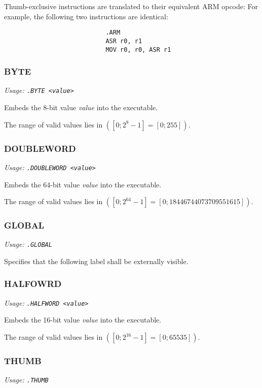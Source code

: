 \documentclass[a4paper]{article}
\begin{document}
				Thumb-exclusive instructions are translated to their equivalent ARM opcode: For example, the following two instructions are identical:

				\begin{center}
					\begin{varwidth}{\linewidth}
						\begin{verbatim}
							.ARM
							ASR r0, r1
							MOV r0, r0, ASR r1
						\end{verbatim}
					\end{varwidth}
				\end{center}

			\subsubsection{BYTE}
				\textit{Usage: \texttt{.BYTE <value>}}

				Embeds the 8-bit value \textit{value} into the executable.

				The range of valid values lies in $([0;2^8-1]=[0;255])$.

			\subsubsection{DOUBLEWORD}
				\textit{Usage: \texttt{.DOUBLEWORD <value>}}

				Embeds the 64-bit value \textit{value} into the executable.

				The range of valid values lies in $([0;2^{64}-1]=[0;18446744073709551615])$.

			\subsubsection{GLOBAL}
				\textit{Usage: \texttt{.GLOBAL}}

				Specifies that the following label shall be externally visible.

			\subsubsection{HALFOWRD}
				\textit{Usage: \texttt{.HALFWORD <value>}}

				Embeds the 16-bit value \textit{value} into the executable.

				The range of valid values lies in $([0;2^{16}-1]=[0;65535])$.

			\subsubsection{THUMB}
				\textit{Usage: \texttt{.THUMB}}
\end{document}
